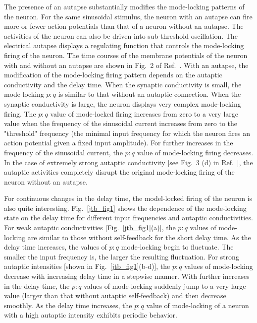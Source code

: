 \documentclass[twocolumn,showpacs,preprintnumbers,amsmath,amssymb,pre,superscriptaddress]{revtex4-1}
\begin{document}
\begin{CJK}{UTF8}{gbsn}
The presence of an autapse substantially modifies the mode-locking patterns of the neuron. For the same sinusoidal stimulus, the neuron with an autapse can fire more or fewer action potentials than that of a neuron without an autapse. The activities of the neuron can also be driven into sub-threshold oscillation. The electrical autapse displays a regulating function that controls the mode-locking firing of the neuron. The time courses of the membrane potentials of the neuron with and without an autapse are shown in Fig.~2 of Ref.~\cite{wht_jtb}. With an autapse, the modification of the mode-locking firing pattern depends on the autaptic conductivity and the delay time. When the synaptic conductivity is small, the mode-locking $p:q$ is similar to that without an autaptic connection. When the synaptic conductivity is large, the neuron displays very complex mode-locking firing. The $p:q$ value of mode-locked firing increases from zero to a very large value when the frequency of the sinusoidal current increases from zero to the "threshold" frequency (the minimal input frequency for which the neuron fires an action potential given a fixed input amplitude). For further increases in the frequency of the sinusoidal current, the $p:q$ value of mode-locking firing decreases. In the case of extremely strong autaptic conductivity [see Fig.~3 (d) in Ref.~\cite{wht_jtb}], the autaptic activities completely disrupt the original mode-locking firing of the neuron without an autapse.

For continuous changes in the delay time, the model-locked firing of the neuron is also quite interesting. Fig.~\ref{jtb_fig1} shows the dependence of the mode-locking state on the delay time for different input frequencies and autaptic conductivities. For weak autaptic conductivities [Fig.~\ref{jtb_fig1}(a)], the $p:q$ values of mode-locking are similar to those without self-feedback for the short delay time. As the delay time increases, the values of $p:q$ mode-locking begin to fluctuate. The smaller the input frequency is, the larger the resulting fluctuation. For strong autaptic intensities [shown in Fig.~\ref{jtb_fig1}(b-d)], the $p:q$ values of mode-locking decrease with increasing delay time in a stepwise manner. With further increases in the delay time, the $p:q$ values of mode-locking suddenly jump to a very large value (larger than that without autaptic self-feedback) and then decrease smoothly. As the delay time increases, the $p:q$ value of mode-locking of a neuron with a high autaptic intensity exhibits periodic behavior.



\end{CJK}
\end{document}
